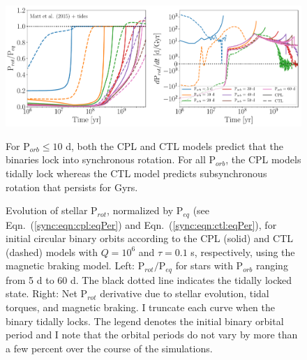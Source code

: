 \begin{figure}
	\includegraphics[width=\columnwidth]{eqPerTwoPanelMatt.pdf}
   \caption{Evolution of stellar P$_{rot}$, normalized by P$_{eq}$ (see Eqn.~(\ref{sync:eqn:cpl:eqPer}) and Eqn.~(\ref{sync:eqn:ctl:eqPer}), for initial circular binary orbits according to the CPL (solid) and CTL (dashed) models with $Q = 10^6$ and $\tau = 0.1$ s, respectively, using the \citet{Matt2015} magnetic braking model. Left: P$_{rot}/$P$_{eq}$ for stars with P$_{orb}$ ranging from 5 d to 60 d. The black dotted line indicates the tidally locked state.  Right: Net P$_{rot}$ derivative due to stellar evolution, tidal torques, and magnetic braking.  I truncate each curve when the binary tidally locks. The legend denotes the initial binary orbital period and I note that the orbital periods do not vary by more than a few percent over the course of the simulations.} For P$_{orb} \leq 10$ d, both the CPL and CTL models predict that the binaries lock into synchronous rotation.  For all P$_{orb}$, the CPL models tidally lock whereas the CTL model predicts subsynchronous rotation that persists for Gyrs.%
    \label{sync:fig:eqPer}%
\end{figure}


